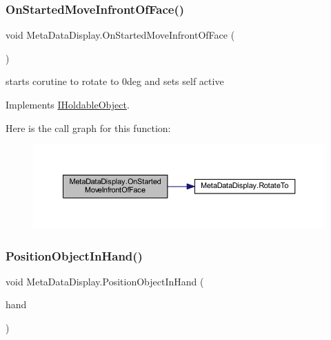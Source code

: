 \subsubsection{\texorpdfstring{On\+Started\+Move\+Infront\+Of\+Face()}{OnStartedMoveInfrontOfFace()}}
{\footnotesize\ttfamily void Meta\+Data\+Display.\+On\+Started\+Move\+Infront\+Of\+Face (\begin{DoxyParamCaption}{ }\end{DoxyParamCaption})}



starts corutine to rotate to 0deg and sets self active 



Implements \mbox{\hyperlink{interface_i_holdable_object_af5dcdd5524539104706dadd8a0e15e08}{I\+Holdable\+Object}}.

Here is the call graph for this function\+:\nopagebreak
\begin{figure}[H]
\begin{center}
\leavevmode
\includegraphics[width=350pt]{class_meta_data_display_aa0a9b9ca8243943104c82602e69a0541_cgraph}
\end{center}
\end{figure}
\mbox{\label{class_meta_data_display_a1ecbc336a25464fc9999120066263e2a}} 
\subsubsection{\texorpdfstring{Position\+Object\+In\+Hand()}{PositionObjectInHand()}}
{\footnotesize\ttfamily void Meta\+Data\+Display.\+Position\+Object\+In\+Hand (\begin{DoxyParamCaption}\item[{\mbox{\hyperlink{class_player_hand}{Player\+Hand}}}]{hand }\end{DoxyParamCaption})}



